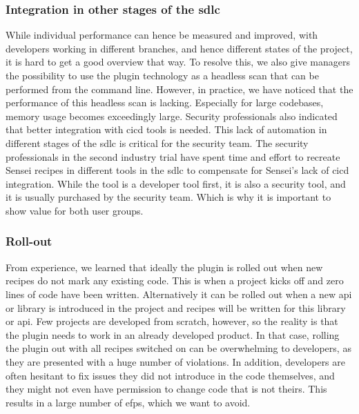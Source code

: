 \subsubsection{Integration in other stages of the \gls{sdlc}}
While individual performance can hence be measured and improved, with developers working in different branches, and hence different states of the project, it is hard to get a good overview that way.
To resolve this, we also give managers the possibility to use the plugin technology as a headless scan that can be performed from the command line.
However, in practice, we have noticed that the performance of this headless scan is lacking.
Especially for large codebases, memory usage becomes exceedingly large.
Security professionals also indicated that better integration with \gls{cicd} tools is needed.
This lack of automation in different stages of the \gls{sdlc} is critical for the security team.
The security professionals in the second industry trial have spent time and effort to recreate Sensei recipes in different tools in the \gls{sdlc} to compensate for Sensei's lack of \gls{cicd} integration.
While the tool is a developer tool first, it is also a security tool, and it is usually purchased by the security team.
Which is why it is important to show value for both user groups.

\subsubsection{Roll-out}
From experience, we learned that ideally the plugin is rolled out when new recipes do not mark any existing code.
This is when a project kicks off and zero lines of code have been written. 
Alternatively it can be rolled out when a new \gls{api} or library is introduced in the project and recipes will be written for this library or \gls{api}.
Few projects are developed from scratch, however, so the reality is that the plugin needs to work in an already developed product.
In that case, rolling the plugin out with all recipes switched on can be overwhelming to developers, as they are presented with a huge number of violations.
In addition, developers are often hesitant to fix issues they did not introduce in the code themselves, and they might not even have permission to change code that is not theirs.
This results in a large number of \glspl{efp}, which we want to avoid.

